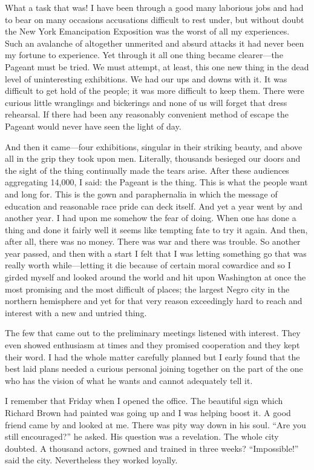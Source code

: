 \documentclass[letterpaper,10pt,english]{jupyterBook}
\begin{document}
\sphinxAtStartPar
What a task that was! I have been through a good many laborious jobs and had to bear on many occasions accusations difficult to rest under, but without doubt the New York Emancipation Exposition was the worst of all my experiences. Such an avalanche of altogether unmerited and absurd attacks it had never been my fortune to experience. Yet through it all one thing became clearer—the Pageant must be tried. We must attempt, at least, this one new thing in the dead level of uninteresting exhibitions. We had our ups and downs with it. It was difficult to get hold of the people; it was more difficult to keep them. There were curious little wranglings and bickerings and none of us will forget that dress rehearsal. If there had been any reasonably convenient method of escape the Pageant would never have seen the light of day.

\sphinxAtStartPar
And then it came—four exhibitions, singular in their striking beauty, and above all in the grip they took upon men. Literally, thousands besieged our doors and the sight of the thing continually made the tears arise. After these audiences aggregating 14,000, I said: the Pageant is the thing. This is what the people want and long for. This is the gown and paraphernalia in which the message of education and reasonable race pride can deck itself. And yet a year went by and another year. I had upon me somehow the fear of doing. When one has done a thing and done it fairly well it seems like tempting fate to try it again. And then, after all, there was no money. There was war and there was trouble. So another year passed, and then with a start I felt that I was letting something go that was really worth while—letting it die because of certain moral cowardice and so I girded myself and looked around the world and hit upon Washington at once the most promising and the most difficult of places; the largest Negro city in the northern hemisphere and yet for that very reason exceedingly hard to reach and interest with a new and untried thing.

\sphinxAtStartPar
The few that came out to the preliminary meetings listened with interest. They even showed enthusiasm at times and they promised cooperation and they kept their word. I had the whole matter carefully planned but I early found that the best laid plans needed a curious personal joining together on the part of the one who has the vision of what he wants and cannot adequately tell it.

\sphinxAtStartPar
I remember that Friday when I opened the office. The beautiful sign which Richard Brown had painted was going up and I was helping boost it. A good friend came by and looked at me. There was pity way down in his soul. “Are you still encouraged?” he asked. His question was a revelation. The whole city doubted. A thousand actors, gowned and trained in three weeks? “Impossible!” said the city. Nevertheless they worked loyally.
\end{document}
